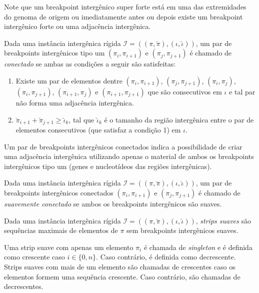 Note que um breakpoint intergênico super forte está em uma das extremidades do genoma de origem ou imediatamente antes ou depois existe um breakpoint intergênico forte ou uma adjacência intergênica.

\begin{definition}\label{definition:SUHDBNQI}
  Dada uma instância intergênica rígida $\mathcal{I} = ((\pi,\breve\pi),(\iota,\breve\iota))$, um par de breakpoints intergênicos tipo um $(\pi_{i},\pi_{i+1})$ e $(\pi_{j},\pi_{j+1})$ é chamado de \emph{conectado} se ambas as condições a seguir são satisfeitas:
  \begin{enumerate}
    \item Existe um par de elementos dentre $(\pi_{i},\pi_{i+1})$, $(\pi_{j},\pi_{j+1})$, $(\pi_{i},\pi_{j})$, $(\pi_{i},\pi_{j+1})$, $(\pi_{i+1},\pi_{j})$ e $(\pi_{i+1},\pi_{j+1})$ que são consecutivos em $\iota$ e tal par não forma uma adjacência intergênica.
    \item $\breve\pi_{i+1} + \breve\pi_{j+1} \ge \breve\iota_{k}$, tal que $\breve\iota_{k}$ é o tamanho da região intergênica entre o par de elementos consecutivos (que satisfaz a condição 1) em $\iota$.
  \end{enumerate}
\end{definition}

Um par de breakpoints intergênicos conectados indica a possibilidade de criar uma adjacência intergênica utilizando apenas o material de ambos os breakpoints intergênicos tipo um (genes e nucleotídeos das regiões intergênicas).

\begin{definition}
Dada uma instância intergênica rígida $\mathcal{I} = ((\pi,\breve\pi),(\iota,\breve\iota))$, um par de breakpoints intergênicos conectados $(\pi_{i},\pi_{i+1})$ e $(\pi_{j},\pi_{j+1})$ é chamado de \emph{suavemente conectado} se ambos os breakpoints intergênicos são suaves.
\end{definition}

\begin{definition}
  Dada uma instância intergênica rígida $\mathcal{I} = ((\pi,\breve\pi),(\iota,\breve\iota))$, \emph{strips suaves} são sequências maximais de elementos de $\pi$ sem breakpoints intergênicos suaves.
\end{definition}

Uma strip suave com apenas um elemento $\pi_i$ é chamada de \emph{singleton} e é definida como crescente caso  $i \in \{0,n\}$. Caso contrário, é definida como decrescente. Strips suaves com mais de um elemento são chamadas de crescentes caso os elementos formem uma sequência crescente. Caso contrário, são chamadas de decrescentes.


